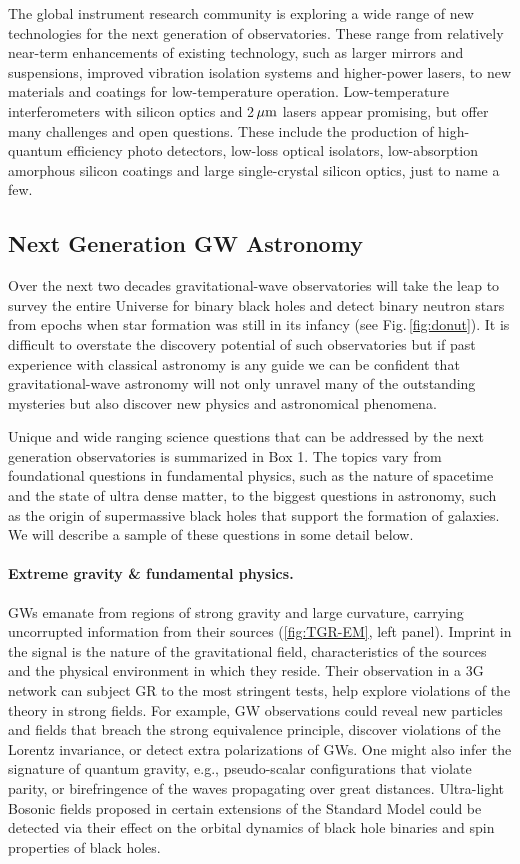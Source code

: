 \documentclass[twocolumn,aps,prd,nofootinbib,superscriptaddress,10pt,notitlepage,preprintnumbers] {revtex4-1}
\begin{document}
The global instrument research community is exploring a wide range of new technologies for
 the next generation of observatories.
These range from relatively near-term enhancements of existing technology,
 such as larger mirrors and suspensions, improved vibration isolation systems and higher-power lasers,
 to new materials and coatings for low-temperature operation.
Low-temperature interferometers with silicon optics and 2\,$\rm \mu m$ lasers appear promising,
 but offer many challenges and open questions.
These include the production of high-quantum efficiency photo detectors, low-loss optical isolators,
 low-absorption amorphous silicon coatings and large single-crystal silicon optics, just to name a few.

\subsection*{\bf Next Generation GW Astronomy}
Over the next two decades gravitational-wave observatories will take the leap to survey the entire Universe for binary black holes and detect binary neutron stars from epochs when star formation was still in its infancy (see Fig.\,\ref{fig:donut}). It is difficult to overstate the discovery potential of such observatories but if past experience with classical astronomy is any guide we can be confident that gravitational-wave astronomy will not only unravel many of the outstanding mysteries but also discover new physics and astronomical phenomena.

Unique and wide ranging science questions that can be addressed by the next generation observatories is summarized in Box 1. The topics vary from foundational questions in fundamental physics, such as the nature of spacetime and the state of ultra dense matter, to the biggest questions in astronomy, such as the origin of supermassive black holes that support the formation of galaxies. We will describe a sample of these questions in some detail below.

\noindent \paragraph{Extreme gravity \& fundamental physics.}
GWs emanate from regions of strong gravity and large curvature, carrying uncorrupted information from their sources (\ref{fig:TGR-EM}, left panel). Imprint in the signal is the nature of the gravitational field, characteristics of the sources and the physical environment in which they reside. Their observation in a 3G network can subject GR to the most stringent tests, help explore violations of the theory in strong fields. For example, GW observations could reveal new particles and fields that breach the strong equivalence principle, discover violations of the Lorentz invariance, or detect extra polarizations of GWs. One might also infer the signature of quantum gravity, e.g., pseudo-scalar configurations that violate parity, or birefringence of the waves propagating over great distances.  Ultra-light Bosonic fields proposed in certain extensions of the Standard Model could be detected via their effect on the orbital dynamics of black hole binaries and spin properties of black holes.
\end{document}
